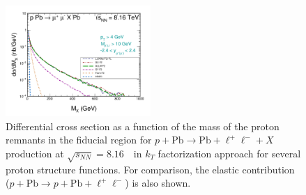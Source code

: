 \begin{figure}[!h]

 \includegraphics[width=0.49\textwidth]{figures_Marta/MX-c.pdf}
\caption{Differential cross section as a function of the mass of the proton remnants in the fiducial region for $p+\textrm{Pb}\rightarrow \textrm{Pb} + \ell^+\ell^- + X$ production at $\sqrt{s_{N N}} = 8.16$~\TeV\ in $k_T$ factorization approach for several proton structure functions.
For comparison, the elastic contribution ($p+\textrm{Pb}\rightarrow p+ \textrm{Pb} + \ell^+\ell^-$) is also shown.
}
 \label{fig:kt_figures3}
\end{figure}





